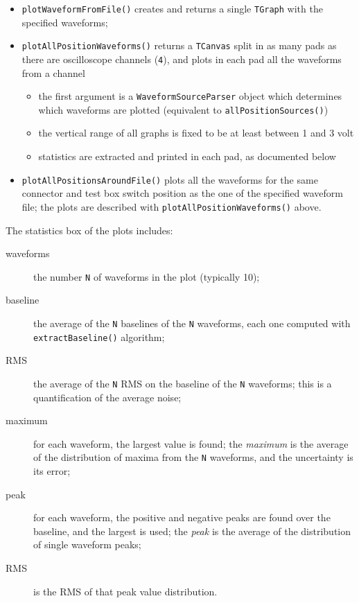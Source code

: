 \begin{itemize}
  \item
    \texttt{plotWaveformFromFile()} creates and returns a single
    \texttt{TGraph} with the specified waveforms;
  \item
    \texttt{plotAllPositionWaveforms()} returns a \texttt{TCanvas} split
    in as many pads as there are oscilloscope channels (\texttt{4}), and
    plots in each pad all the waveforms from a channel

    \begin{itemize}
      \item
        the first argument is a \texttt{WaveformSourceParser} object which
        determines which waveforms are plotted (equivalent to
        \texttt{allPositionSources()})
      \item
        the vertical range of all graphs is fixed to be at least between 1
        and 3 volt
      \item
        statistics are extracted and printed in each pad, as documented
        below
    \end{itemize}
  \item
    \texttt{plotAllPositionsAroundFile()} plots all the waveforms for the
    same connector and test box switch position as the one of the
    specified waveform file; the plots are described with
    \texttt{plotAllPositionWaveforms()} above.
\end{itemize}
The statistics box of the plots includes:
\begin{description}
  \item[waveforms] the number \texttt{N} of waveforms in the plot
    (typically 10);
  \item[baseline] the average of the \texttt{N} baselines of the \texttt{N}
    waveforms, each one computed with \texttt{extractBaseline()} algorithm;
  \item[RMS] the average of the \texttt{N} RMS on the baseline of the \texttt{N}
    waveforms; this is a quantification of the average noise;
  \item[maximum] for each waveform, the largest value is found; the
    \emph{maximum} is the average of the distribution of maxima from the
    \texttt{N} waveforms, and the uncertainty is its error;
  \item[peak] for each waveform, the positive and negative peaks are found over
    the baseline, and the largest is used; the \emph{peak} is the average of the
    distribution of single waveform peaks;
  \item[RMS] is the RMS of that peak value distribution.
\end{description}
